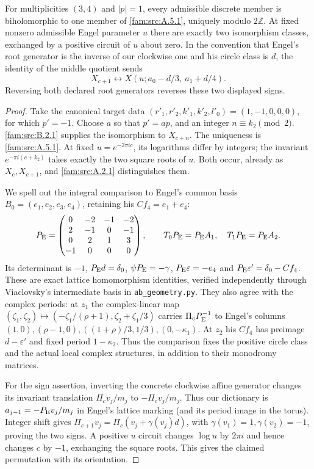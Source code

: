 \begin{proposition}\label{fam:src:B.2.2}\label{fam:st:B.2.2}
For multiplicities $(3,4)$ and $|p|=1$, every admissible discrete member is biholomorphic to one member of \ref{fam:src:A.5.1}, uniquely modulo $2\mathbb Z$. At fixed nonzero admissible Engel parameter $u$ there are exactly two isomorphism classes, exchanged by a positive circuit of $u$ about zero. In the convention that Engel's root generator is the inverse of our clockwise one and his circle class is $d$, the identity of the middle quotient sends
\[
 X_{c+1}\longleftrightarrow X(u;a_0-d/3,\ a_1+d/4).
\]
Reversing both declared root generators reverses these two displayed signs.
\end{proposition}

\begin{proof}
Take the canonical target data $(r'_1,r'_2,k'_1,k'_2,l'_0)=(1,-1,0,0,0)$, for which $p'=-1$. Choose $a$ so that $p'=ap$, and an integer $n\equiv k_2\pmod2$. \ref{fam:src:B.2.1} supplies the isomorphism to $X_{c+n}$. The uniqueness is \ref{fam:src:A.5.1}. At fixed $u=e^{-2\pi ic}$, its logarithms differ by integers; the invariant $e^{-\pi i(c+k_2)}$ takes exactly the two square roots of $u$. Both occur, already as $X_c,X_{c+1}$, and \ref{fam:src:A.2.1} distinguishes them.

We spell out the integral comparison to Engel's common basis $B_0=(e_1,e_2,e_3,e_4)$, retaining his $C f_4=e_1+e_4$:
\[
 P_{\rm E}=\begin{pmatrix}0&-2&-1&-2\\2&-1&0&-1\\0&2&1&3\\-1&0&0&0\end{pmatrix},\qquad
 T_0P_{\rm E}=P_{\rm E}A_1,\quad T_1P_{\rm E}=P_{\rm E}A_2.
\]
Its determinant is $-1$, $P_{\rm E}d=\delta_0$, $\psi P_{\rm E}=-\gamma$, $P_{\rm E}\varepsilon=-e_4$ and $P_{\rm E}\varepsilon'=\delta_0-Cf_4$. These are exact lattice homomorphism identities, verified independently through Viaclovsky's intermediate basis in \texttt{ab\_geometry.py}. They also agree with the complex periods: at $z_1$ the complex-linear map
$(\zeta_1,\zeta_2)\mapsto(-\zeta_1/(\rho+1),\zeta_2+\zeta_1/3)$ carries $\Pi_cP_{\rm E}^{-1}$ to Engel's columns $(1,0),(\rho-1,0),((1+\rho)/3,1/3),(0,-\kappa_1)$. At $z_2$ his $Cf_4$ has preimage $d-\varepsilon'$ and fixed period $1-\kappa_2$. Thus the comparison fixes the positive circle class and the actual local complex structures, in addition to their monodromy matrices.

For the sign assertion, inverting the concrete clockwise affine generator changes its invariant translation $\Pi_cv_j/m_j$ to $-\Pi_cv_j/m_j$. Thus our dictionary is $a_{j-1}=-P_{\rm E}v_j/m_j$ in Engel's lattice marking (and its period image in the torus). Integer shift gives $\Pi_{c+1}v_j=\Pi_c(v_j+\gamma(v_j)d)$, with $\gamma(v_1)=1,\gamma(v_2)=-1$, proving the two signs. A positive $u$ circuit changes $\log u$ by $2\pi i$ and hence changes $c$ by $-1$, exchanging the square roots. This gives the claimed permutation with its orientation.
\end{proof}

